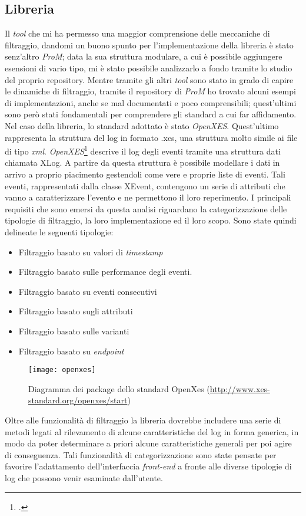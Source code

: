 \subsection{Libreria}
 Il \textit{tool} che mi ha permesso una maggior comprensione delle meccaniche di filtraggio, dandomi un buono spunto per l'implementazione della libreria è stato senz'altro \textit{ProM}; data la sua struttura modulare, a cui è possibile aggiungere esensioni di vario tipo, mi è stato possibile analizzarlo a fondo tramite lo studio del proprio repository. Mentre tramite gli altri \textit{tool} sono stato in grado di capire le dinamiche di filtraggio, tramite il repository di \textit{ProM} ho trovato alcuni esempi di implementazioni, anche se mal documentati e poco comprensibili; quest'ultimi sono però stati fondamentali per comprendere gli standard a cui far affidamento. Nel caso della libreria, lo standard adottato è stato \textit{OpenXES}. Quest'ultimo rappresenta la struttura del log in formato .xes, una struttura molto simile ai file di tipo \textit{xml}. \textit{OpenXES}\footcite{OpenXES: http://www.xes-standard.org/openxes/start} descrive il log degli eventi tramite una struttura dati chiamata XLog. A partire da questa struttura è possibile modellare i dati in arrivo a proprio piacimento gestendoli come vere e proprie liste di eventi. Tali eventi, rappresentati dalla classe XEvent, contengono un serie di attributi che vanno a caratterizzare l'evento e ne permettono il loro reperimento. I principali requisiti che sono emersi da questa analisi riguardano la categorizzazione delle tipologie di filtraggio, la loro implementazione ed il loro scopo. Sono state quindi delineate le seguenti tipologie:
\begin{itemize}
	\item Filtraggio basato su valori di \textit{timestamp}
	\item Filtraggio basato sulle performance degli eventi.
	\item Filtraggio basato su eventi consecutivi
	\item Filtraggio basato sugli attributi
	\item Filtraggio basato sulle varianti
	\item Filtraggio basato su \textit{endpoint}
\end{itemize}
\begin{figure}[!h] 
	\centering 
	\texttt{[image: openxes]} 
	\caption{Diagramma dei package dello standard OpenXes (\url{http://www.xes-standard.org/openxes/start})}
\end{figure}
Oltre alle funzionalità di filtraggio la libreria dovrebbe includere una serie di metodi legati al rilevamento di alcune caratteristiche del log in forma generica, in modo da poter determinare a priori alcune caratteristiche generali per poi agire di conseguenza.
Tali funzionalità di categorizzazione sono state pensate per favorire l'adattamento dell'interfaccia \textit{front-end} a fronte alle diverse tipologie di log che possono venir esaminate dall'utente.
\newpage
